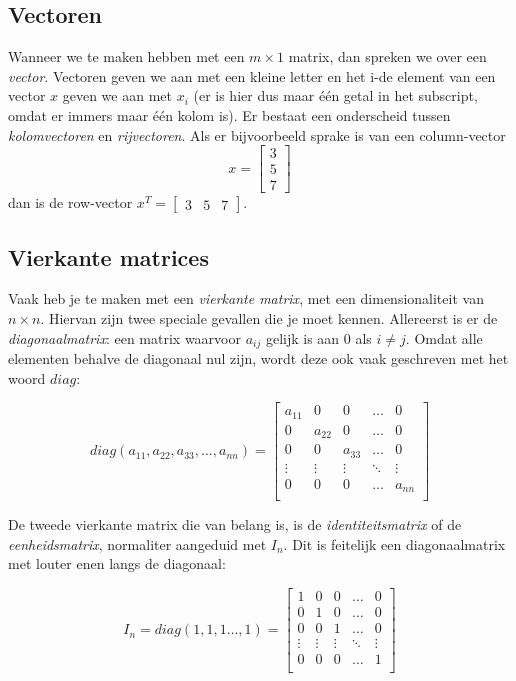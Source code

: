 \subsection{Vectoren}
Wanneer we te maken hebben met een $m \times 1$ matrix, dan spreken we over een \textit{vector}. Vectoren geven we aan met een kleine letter en het i-de element van een vector $x$ geven we aan met $x_i$ (er is hier dus maar één getal in het subscript, omdat er immers maar één kolom is). Er bestaat een onderscheid tussen \textit{kolomvectoren} en \textit{rijvectoren}. Als er bijvoorbeeld sprake is van een column-vector
%
\[ 
x = \begin{bmatrix} 
3\\
5\\
7
\end{bmatrix}
\] 
%
dan is de row-vector $x^T = \begin{bmatrix}3 & 5 & 7\end{bmatrix}$.

\subsection{Vierkante matrices}
Vaak heb je te maken met een \textit{vierkante matrix}, met een dimensionaliteit van $n \times n$. Hiervan zijn twee speciale gevallen die je moet kennen. Allereerst is er de \textit{diagonaalmatrix}: een matrix waarvoor $a_{ij}$ gelijk is aan $0$ als $i \neq j$. Omdat alle elementen behalve de diagonaal nul zijn, wordt deze ook vaak geschreven met het woord $diag$:

\[
diag(a_{11}, a_{22}, a_{33}, \hdots, a_{nn}) =
\begin{bmatrix}
a_{11} & 0 & 0 & \hdots & 0 \\
0 & a_{22} & 0 & \hdots & 0 \\
0 & 0 & a_{33} & \hdots & 0 \\
\vdots & \vdots &\vdots & \ddots & \vdots \\
0 & 0 & 0 & \hdots & a_{nn} \\
\end{bmatrix}
\]

De tweede vierkante matrix die van belang is, is de \textit{identiteitsmatrix} of de \textit{eenheidsmatrix}, normaliter aangeduid met $I_n$. Dit is feitelijk een diagonaalmatrix met louter enen langs de diagonaal:

\[
I_n = diag(1, 1, 1 \hdots, 1) = 
\begin{bmatrix}
1 & 0 & 0 & \hdots & 0 \\
0 & 1 & 0 & \hdots & 0 \\
0 & 0 & 1 & \hdots & 0 \\
\vdots & \vdots &\vdots & \ddots & \vdots \\
0 & 0 & 0 & \hdots & 1 \\
\end{bmatrix}
\]

